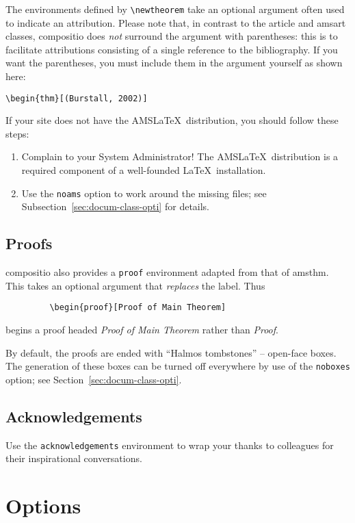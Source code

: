 \documentclass[noams]{compositio}
\newcommand*{\pkg}[1]{{\mdseries\textsf{#1}}}
\begin{document}
The environments defined by \verb+\newtheorem+ take an optional
argument often used to indicate an attribution.  Please note that,
in contrast to the \pkg{article} and \pkg{amsart} classes,
\pkg{compositio} does \emph{not} surround the argument with
parentheses: this is to facilitate attributions consisting of a
single reference to the bibliography.  If you want the parentheses,
you must include them in the argument yourself as shown here:

\verb+\begin{thm}[(Burstall, 2002)]+

\noindent
If your site does not have the AMS\LaTeX\ distribution, you should
follow these steps:
\begin{enumerate}
\item Complain to your System Administrator!  The AMS\LaTeX\
distribution is a required component of a well-founded \LaTeX\
installation.
\item Use the \texttt{noams} option to work around the missing files;
see Subsection~\ref{sec:docum-class-opti} for details.
\end{enumerate}

\subsection{Proofs}
\label{sec:proofs}

\pkg{compositio} also provides a \texttt{proof} environment adapted
from that of \pkg{amsthm}.  This takes an  optional argument that
\textit{replaces} the label.  Thus

\verb+         \begin{proof}[Proof of Main Theorem]+

\noindent begins a proof headed \emph{Proof of Main Theorem} rather
than \emph{Proof}.

By default, the proofs are ended with ``Halmos tombstones'' --
open-face boxes. The generation of these boxes can be turned off
everywhere by use of the \texttt{noboxes} option; see
Section~\ref{sec:docum-class-opti}.

\subsection{Acknowledgements}
\label{sec:acknowledgements}

Use the \texttt{acknowledgements} environment to wrap your
thanks to colleagues for their inspirational conversations.

\section{Options}
\label{sec:options}
\end{document}
